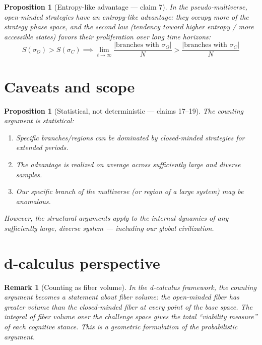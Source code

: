 \documentclass[11pt,a4paper]{article}
\newtheorem{proposition}[definition]{Proposition}
\newtheorem{remark}[definition]{Remark}
\begin{document}
\begin{proposition}[Entropy-like advantage --- claim 7]
\label{prop:entropy}
In the pseudo-multiverse, open-minded strategies have an entropy-like
advantage: they occupy more of the strategy phase space, and the
second law (tendency toward higher entropy / more accessible states)
favors their proliferation over long time horizons:
\[
  S(\sigma_O) > S(\sigma_C) \implies
  \lim_{t \to \infty} \frac{|\text{branches with } \sigma_O|}{N} >
  \frac{|\text{branches with } \sigma_C|}{N}
\]
\end{proposition}

\section{Caveats and scope}
\label{sec:caveats}

\begin{proposition}[Statistical, not deterministic --- claims 17--19]
\label{prop:caveats}
The counting argument is statistical:
\begin{enumerate}
\item Specific branches/regions can be dominated by closed-minded
  strategies for extended periods.
\item The advantage is realized \emph{on average} across sufficiently
  large and diverse samples.
\item Our specific branch of the multiverse (or region of a large
  system) may be anomalous.
\end{enumerate}
However, the structural arguments apply to the internal dynamics of
any sufficiently large, diverse system --- including our global
civilization.
\end{proposition}

\section{d-calculus perspective}
\label{sec:d-calc}

\begin{remark}[Counting as fiber volume]
In the d-calculus framework, the counting argument becomes a statement
about fiber volume: the open-minded fiber has greater volume than the
closed-minded fiber at every point of the base space. The integral of
fiber volume over the challenge space gives the total ``viability
measure'' of each cognitive stance. This is a geometric formulation of
the probabilistic argument.
\end{remark}
\end{document}
